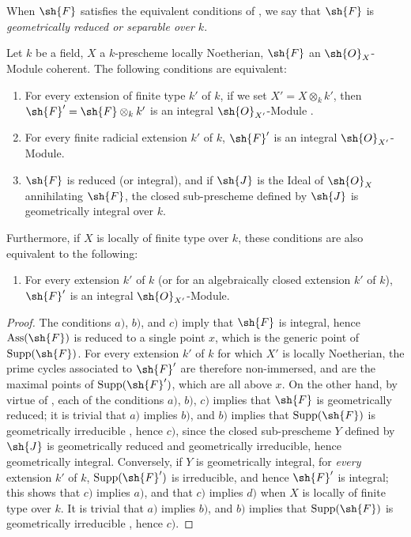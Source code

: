 \begin{definition}[4.6.17]
\label{IV.4.6.17}
When $\sh{F}$ satisfies the equivalent conditions of , we say that $\sh{F}$ is \emph{geometrically reduced or separable over $k$}.
\end{definition}

\begin{proposition}[4.6.18]
\label{IV.4.6.18}
Let $k$ be a field, $X$ a $k$-prescheme locally Noetherian, $\sh{F}$ an $\sh{O}_X$-Module coherent.
The following conditions are equivalent:
\begin{enumerate}[label=\emph{\alph*)}]
  \item For every extension of finite type $k'$ of $k$, if we set $X'=X\otimes_k k'$, then $\sh{F}'=\sh{F}\otimes_k k'$ is an integral $\sh{O}_{X'}$-Module .
  \item For every finite radicial extension $k'$ of $k$, $\sh{F}'$ is an integral $\sh{O}_{X'}$-Module.
  \item $\sh{F}$ is reduced (or integral), and if $\sh{J}$ is the Ideal of $\sh{O}_X$ annihilating $\sh{F}$, the closed sub-prescheme defined by $\sh{J}$ is geometrically integral over $k$.
\end{enumerate}
Furthermore, if $X$ is locally of finite type over $k$, these conditions are also equivalent to the following:
\begin{enumerate}
  \item[\emph{d)}] For every extension $k'$ of $k$ (or for an algebraically closed extension $k'$ of $k$), $\sh{F}'$ is an integral $\sh{O}_{X'}$-Module.
\end{enumerate}
\end{proposition}

\begin{proof}
The conditions $a)$, $b)$, and $c)$ imply that $\sh{F}$ is integral, hence $\operatorname{Ass}(\sh{F})$ is reduced to a single point $x$, which is the generic point of $\operatorname{Supp}(\sh{F})$.
For every extension $k'$ of $k$ for which $X'$ is locally Noetherian, the prime cycles associated to $\sh{F}'$ are therefore non-immersed, and are the maximal points of $\operatorname{Supp}(\sh{F}')$, which are all above $x$.
On the other hand, by virtue of , each of the conditions $a)$, $b)$, $c)$ implies that $\sh{F}$ is geometrically reduced; it is trivial that $a)$ implies $b)$, and $b)$ implies that $\operatorname{Supp}(\sh{F})$ is geometrically irreducible , hence $c)$, since the closed sub-prescheme $Y$ defined
by $\sh{J}$ is geometrically reduced and geometrically irreducible, hence geometrically integral.
Conversely, if $Y$ is geometrically integral, for \emph{every} extension $k'$ of $k$, $\operatorname{Supp}(\sh{F}')$ is irreducible, and hence $\sh{F}'$ is integral; this shows that $c)$ implies $a)$, and that $c)$ implies $d)$ when $X$ is locally of finite type over $k$.
It is trivial that $a)$ implies $b)$, and $b)$ implies that $\operatorname{Supp}(\sh{F})$ is geometrically irreducible , hence $c)$.
\end{proof}

